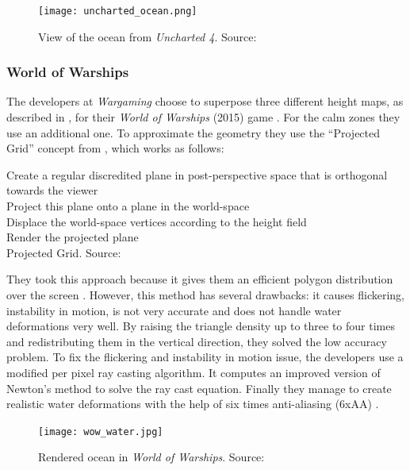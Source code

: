 \begin{figure}[h]
    \centering
    \texttt{[image: uncharted\_ocean.png]}
    \caption{View of the ocean from \textit{Uncharted 4}. Source:
    \autocite{gonzalez2016rendering}}\label{fig:uncharted}
\end{figure}


\subsubsection{World of Warships}\label{subsub:world_of_warships}

The developers at \textit{Wargaming} choose to superpose three different height
maps, as described in \autocite[Chapter~18]{pharr2005gpu}, for their
\textit{World of Warships} (2015) game \autocite{kryachko2016sea}.  For the calm
zones they use an additional one. To approximate the geometry they use the
``Projected Grid'' concept from \autocite{claes2004real}, which works as
follows:

\begin{algorithm}
    \small
    \DontPrintSemicolon{}
    Create a regular discredited plane in post-perspective space that is
    orthogonal towards the viewer\\
    Project this plane onto a plane in the world-space\\
    Displace the world-space vertices according to the height field\\
    Render the projected plane\\
    \caption{\small{Projected Grid. Source:
    \autocite{claes2004real}}}\label{algo:projected_grid}
\end{algorithm}

They took this approach because it gives them an efficient polygon distribution
over the screen \autocite{kryachko2016sea}. However, this method has several
drawbacks: it causes flickering, instability in motion, is not very accurate and
does not handle water deformations very well. By raising the triangle density up
to three to four times and redistributing them in the vertical direction, they
solved the low accuracy problem. To fix the flickering and instability in motion
issue, the developers use a modified per pixel ray casting algorithm. It
computes an improved version of Newton's method to solve the ray cast equation.
Finally they manage to create realistic water deformations with the help of six
times anti-aliasing (6xAA) \autocite{kryachko2016sea}.

\begin{figure}[h]
    \centering
    \texttt{[image: wow\_water.jpg]}
    \caption{Rendered ocean in \textit{World of Warships}. Source:
    \autocite{kryachko2016sea}}\label{fig:wow_sea}
\end{figure}


